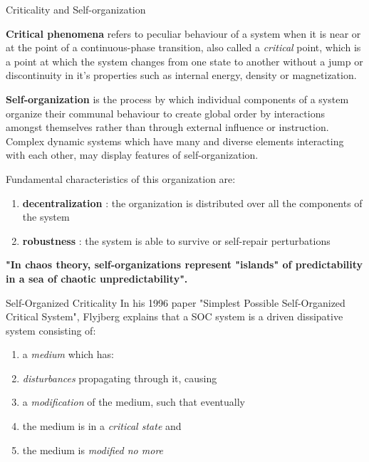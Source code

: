 \begin{frame}{Criticality and Self-organization}

{\bf Critical phenomena} refers to peculiar behaviour of a system when it is near or at the point of a continuous-phase transition, also called a {\it critical} point, which is a point at which the system changes from one state to another without a jump or discontinuity in it's properties such as internal energy, density or magnetization.

\vspace{5mm}

{\bf Self-organization} is the process by which individual components of a system organize their communal behaviour to create global order by interactions amongst themselves rather than through external influence or instruction. Complex dynamic systems which have many and diverse elements interacting with each other, may display features of self-organization. \par
Fundamental characteristics of this organization are:
\begin{enumerate}
	\item {\bf decentralization} : the organization is distributed over all the components of the system
	\item {\bf robustness} : the system is able to survive or self-repair perturbations
\end{enumerate}
{\bf "In chaos theory, self-organizations represent "islands" of predictability in a sea of chaotic unpredictability".}

\end{frame}




\begin{frame}{Self-Organized Criticality}
In his 1996 paper "Simplest Possible Self-Organized Critical System", Flyjberg explains that a SOC system is a driven dissipative system consisting of:
\begin{enumerate}
	\item a {\it medium} which has:
	\item {\it disturbances} propagating through it, causing
	\item a {\it modification} of the medium, such that eventually
	\item the medium is in a {\it critical state} and
	\item the medium is {\it modified no more}
\end{enumerate}
\end{frame}




